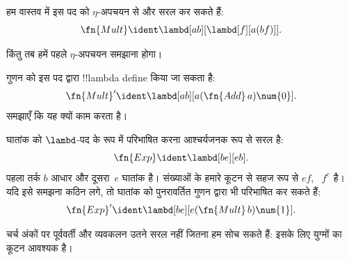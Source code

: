 \documentclass[../../../include/open-logic-section]{subfiles}
\begin{document}
\begin{editorial}
हम वास्तव में इस पद को $\eta$-अपचयन से और सरल कर सकते हैं:
\[
  \fn{Mult} \ident \lambd[ab][\lambd[f][a (b f)]].
\]

किंतु तब हमें पहले $\eta$-अपचयन समझाना होगा।
\end{editorial}

\begin{prob}
गुणन को इस पद द्वारा !!{lambda define} किया जा सकता है:
\[
  \fn{Mult}' \ident \lambd[ab][a (\fn{Add}\, a) \num{0}].
\]
समझाएँ कि यह क्यों काम करता है।
\end{prob}

घातांक को $\lambd$-पद के रूप में परिभाषित करना आश्चर्यजनक रूप से सरल है:
\[
  \fn{Exp} \ident \lambd[be][e b].
\]
पहला तर्क $b$ आधार और दूसरा~$e$ घातांक है। संख्याओं के हमारे कूटन से सहज
रूप से $e f$, ~$f^e$ है। यदि इसे समझना कठिन लगे, तो घातांक को पुनरावर्तित
गुणन द्वारा भी परिभाषित कर सकते हैं:
\[
  \fn{Exp}' \ident \lambd[be][e (\fn{Mult}\, b) \num{1}].
\]

चर्च अंकों पर पूर्ववर्ती और व्यवकलन उतने सरल नहीं जितना हम सोच सकते हैं:
इसके लिए युग्मों का कूटन आवश्यक है।
\end{document}
